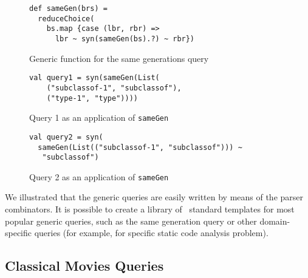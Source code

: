 
\begin{figure}[h]
\begin{lstlisting}
def sameGen(brs) =
  reduceChoice(
    bs.map {case (lbr, rbr) =>
      lbr ~ syn(sameGen(bs).?) ~ rbr})
\end{lstlisting}
\caption{Generic function for the same generations query}
\label{fig:gen}
\end{figure}


\begin{figure}[h]
\begin{lstlisting}
val query1 = syn(sameGen(List(
    ("subclassof-1", "subclassof"),
    ("type-1", "type"))))
\end{lstlisting}
\caption{Query 1 as an application of \lstinline{sameGen}}
\label{fig:query1Gen}
\end{figure}


\begin{figure}[h]
\begin{lstlisting}
val query2 = syn(
  sameGen(List(("subclassof-1", "subclassof"))) ~
   "subclassof")
\end{lstlisting}
\caption{Query 2 as an application of \lstinline{sameGen}}
\label{fig:query2Gen}
\end{figure}


We illustrated that the generic queries are easily written by means of the parser combinators.
It is possible to create a library of \ standard templates for most popular generic queries, such as the same generation query or other domain-specific queries (for example, for specific static code analysis problem).


\subsection{Classical Movies Queries}


